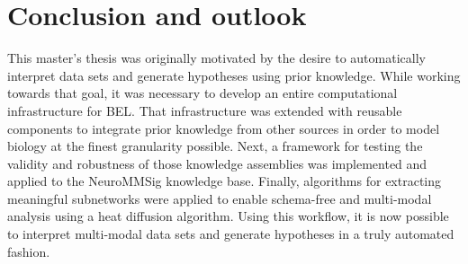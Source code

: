 \chapter{Conclusion and outlook}

This master's thesis was originally motivated by the desire to automatically interpret data sets and generate hypotheses using prior knowledge. While working towards that goal, it was necessary to develop an entire computational infrastructure for BEL. That infrastructure was extended with reusable components to integrate prior knowledge from other sources in order to model biology at the finest granularity possible. Next, a framework for testing the validity and robustness of those knowledge assemblies was implemented and applied to the \ac{NeuroMMSig} knowledge base. Finally, algorithms for extracting meaningful subnetworks were applied to enable schema-free and multi-modal analysis using a heat diffusion algorithm. Using this workflow, it is now possible to interpret multi-modal data sets and generate hypotheses in a truly automated fashion.
